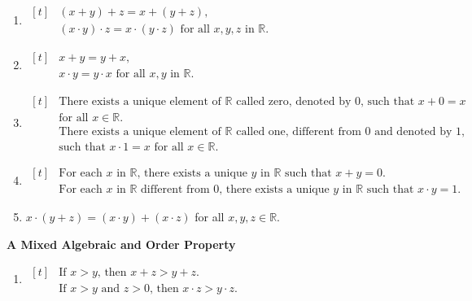 \begin{enumerate}[nosep, leftmargin=*, label=(\arabic*)]
\item \(\begin{aligned}[t]
 &(x + y) + z = x + (y + z), \\
 &(x \cdot y) \cdot z = x \cdot (y \cdot z) \text{ for all } x,y,z \text{ in } \mathbb{R}.
 \end{aligned}\)

\item \(\begin{aligned}[t]
 &x + y = y + x, \\
 &x \cdot y = y \cdot x \text{ for all } x,y \text{ in } \mathbb{R}.
 \end{aligned}\)

\item \(\begin{aligned}[t]
 &\text{There exists a unique element of }\mathbb{R}\text{ called zero, denoted by 0, such that } x + 0 = x\\
 &\text{for all } x \in \mathbb{R}. \\
 &\text{There exists a unique element of }\mathbb{R}\text{ called one, different from 0 and denoted by 1,}\\
 &\text{such that } x \cdot 1 = x \text{ for all } x \in \mathbb{R}.
 \end{aligned}\)

\item \(\begin{aligned}[t]
 &\text{For each }x\text{ in }\mathbb{R}\text{, there exists a unique }y\text{ in }\mathbb{R}\text{ such that } x + y = 0. \\
 &\text{For each }x\text{ in }\mathbb{R}\text{ different from 0, there exists a unique }y\text{ in }\mathbb{R}\text{ such that } x \cdot y = 1.
 \end{aligned}\)

\item \(x \cdot (y + z) = (x \cdot y) + (x \cdot z)\) for all \(x,y,z \in \mathbb{R}\).
\end{enumerate}

\noindent\textbf{A Mixed Algebraic and Order Property}

\begin{enumerate}[nosep, leftmargin=*, label=(\arabic*), resume]
\item \(\begin{aligned}[t]
 &\text{If } x > y \text{, then } x + z > y + z. \\
 &\text{If } x > y \text{ and } z > 0 \text{, then } x \cdot z > y \cdot z.
 \end{aligned}\)
\end{enumerate}


